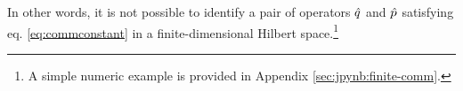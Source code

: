 In other words, it is not possible to identify a pair of operators $\hat{q}$ and $\hat{p}$
satisfying eq. \eqref{eq:commconstant} in a finite-dimensional Hilbert space.\footnote{
  A simple numeric example is provided in Appendix \ref{sec:jpynb:finite-comm}.
}



